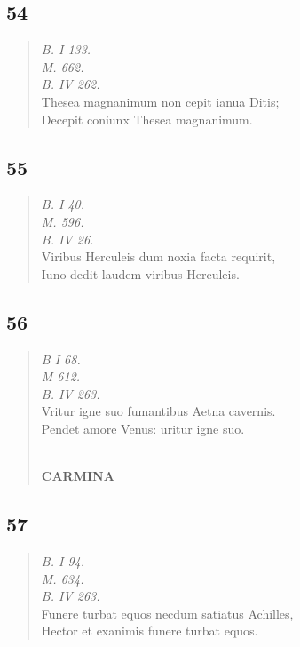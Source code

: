 \documentclass[11pt, a4paper]{report}
\begin{document}
            \subsection*{54}
      \begin{verse}
      \textit{B. I 133.} \\ \textit{M. 662.} \\ \textit{B. IV 262.} \\ Thesea magnanimum non cepit ianua Ditis; \\ Decepit coniunx Thesea magnanimum. \\ 
      \end{verse}
  
            \subsection*{55}
      \begin{verse}
      \textit{B. I 40.} \\ \textit{M. 596.} \\ \textit{B. IV 26.} \\ Viribus Herculeis dum noxia facta requirit, \\ Iuno dedit laudem viribus Herculeis. \\ 
      \end{verse}
  
            \subsection*{56}
      \begin{verse}
      \textit{B I 68.} \\ \textit{M 612.} \\ \textit{B. IV 263.} \\ Vritur igne suo fumantibus Aetna cavernis. \\ Pendet amore Venus: uritur igne suo. \\ 
        ﻿\pagebreak 
    \begin{center} \textbf{CARMINA} \end{center} \marginpar{[106]} 
      \end{verse}
  
            \subsection*{57}
      \begin{verse}
      \textit{B. I 94.} \\ \textit{M. 634.} \\ \textit{B. IV 263.} \\ Funere turbat equos necdum satiatus Achilles, \\ Hector et exanimis funere turbat equos. \\ 
      \end{verse}
  
\end{document}
